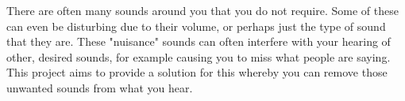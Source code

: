 \label{project}
There are often many sounds around you that you do not require. Some of these can even be disturbing due to their volume, or perhaps just the type of sound that they are. These "nuisance" sounds can often interfere with your hearing of other, desired sounds, for example causing you to miss what people are saying. This project aims to provide a solution for this whereby you can remove those unwanted sounds from what you hear.

